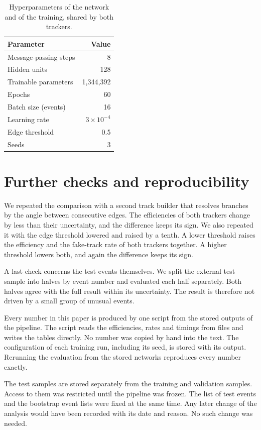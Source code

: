 \begin{table}[tbp]
  \caption{Hyperparameters of the network and of the training, shared by both trackers.}
  \label{tab:hyper}
  \centering
  \begin{tabular}{lr}
    \hline\hline
    Parameter & Value \\
    \hline
    Message-passing steps & 8 \\
    Hidden units & 128 \\
    Trainable parameters & 1,344,392 \\
    Epochs & 60 \\
    Batch size (events) & 16 \\
    Learning rate & $3\times10^{-4}$ \\
    Edge threshold & 0.5 \\
    Seeds & 3 \\
    \hline\hline
  \end{tabular}
\end{table}

\section{Further checks and reproducibility}
\label{app:checks}

We repeated the comparison with a second track builder that resolves branches by the angle between consecutive edges.
The efficiencies of both trackers change by less than their uncertainty, and the difference keeps its sign.
We also repeated it with the edge threshold lowered and raised by a tenth.
A lower threshold raises the efficiency and the fake-track rate of both trackers together.
A higher threshold lowers both, and again the difference keeps its sign.

A last check concerns the test events themselves.
We split the external test sample into halves by event number and evaluated each half separately.
Both halves agree with the full result within its uncertainty.
The result is therefore not driven by a small group of unusual events.

Every number in this paper is produced by one script from the stored outputs of the pipeline.
The script reads the efficiencies, rates and timings from files and writes the tables directly.
No number was copied by hand into the text.
The configuration of each training run, including its seed, is stored with its output.
Rerunning the evaluation from the stored networks reproduces every number exactly.

The test samples are stored separately from the training and validation samples.
Access to them was restricted until the pipeline was frozen.
The list of test events and the bootstrap event lists were fixed at the same time.
Any later change of the analysis would have been recorded with its date and reason.
No such change was needed.
